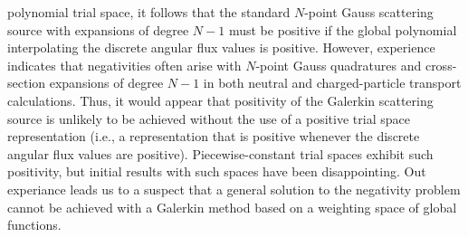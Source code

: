 polynomial trial space, it follows that the standard $N$-point Gauss
scattering source with expansions of degree $N-1$ must be positive if the
global polynomial interpolating the discrete angular flux values is positive.
However, experience indicates that negativities often arise with $N$-point
Gauss quadratures and cross-section expansions of degree $N-1$ in both neutral
and charged-particle transport calculations. Thus, it would appear that
positivity of the Galerkin scattering source is unlikely to be achieved
without the use of a positive trial space representation (i.e., a
representation that is positive whenever the discrete angular flux values are
positive). Piecewise-constant trial spaces exhibit such positivity, but
initial results with such spaces have been disappointing. Out experiance leads
us to a suspect that a general solution to the negativity problem cannot be
achieved with a Galerkin method based on a weighting space of global
functions.
